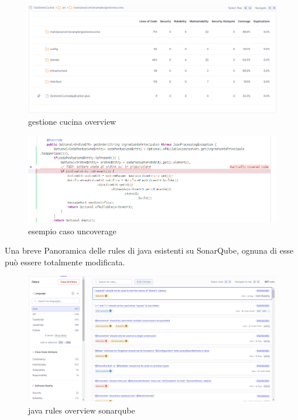 \begin{figure}[htbp]
	\centering
	\includegraphics[scale=0.40]{iterazione1/images/gestione_cucina_overview.png}
	\caption{gestione cucina overview\label{fig:gestione cucina overview}}
\end{figure}

\begin{figure}[htbp]
	\centering
	\includegraphics[scale=0.60]{iterazione1/images/esempio_caso_uncoverage.png}
	\caption{esempio caso uncoverage\label{fig:esempio caso uncoverage}}
\end{figure}

Una breve Panoramica delle rules di java esistenti su SonarQube, ognuna di esse può essere totalmente modificata.
\begin{figure}[htbp]
	\centering
	\includegraphics[scale=0.30]{iterazione1/images/java_rules.png}
	\caption{java rules overview sonarqube\label{fig:java rules}}
\end{figure}

\clearpage